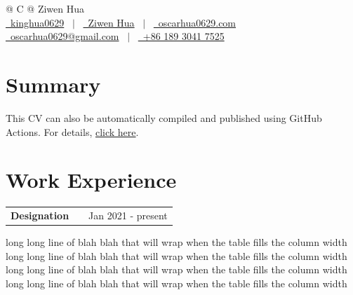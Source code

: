 \documentclass[a4paper,12pt]{article}
\makeatletter
\newenvironment{jobshort}[2]
    {
    \begin{tabularx}{\linewidth}{@{}l X r@{}}
    \textbf{#1} & \hfill &  #2 \\[3.75pt]
    \end{tabularx}
    }
    {
    }
\makeatother
\begin{document}
\pagestyle{empty} 



\begin{tabularx}{\linewidth}{@{} C @{}}
\Huge{Ziwen Hua} \\[7.5pt]
\href{https://github.com/kinghua0629}{\raisebox{-0.05\height}\faGithub\ kinghua0629} \ $|$ \ 
\href{https://linkedin.com/in/ziwen-hua-625a6a3b4}{\raisebox{-0.05\height}\faLinkedin\ Ziwen Hua} \ $|$ \ 
\href{https://oscarhua0629.com}{\raisebox{-0.05\height}\faGlobe \ oscarhua0629.com} \\ 
\href{mailto:oscarhua0629@gmail.com}{\raisebox{-0.05\height}\faEnvelope \ oscarhua0629@gmail.com} \ $|$ \ 
\href{tel:+8618930417525}{\raisebox{-0.05\height}\faMobile \ +86 189 3041 7525} \\
\end{tabularx}


\section{Summary}
This CV can also be automatically compiled and published using GitHub Actions. For details, \href{https://github.com/jitinnair1/autoCV}{click here}.

\section{Work Experience}

\begin{jobshort}{Designation}{Jan 2021 - present}
long long line of blah blah that will wrap when the table fills the column width long long line of blah blah that will wrap when the table fills the column width long long line of blah blah that will wrap when the table fills the column width long long line of blah blah that will wrap when the table fills the column width
\end{jobshort}
\end{document}
